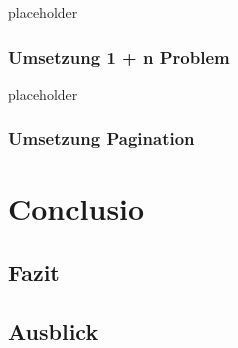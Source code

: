 \documentclass[bachelor, german ]{hgbthesis}
\begin{document}
placeholder
\pagebreak

\subsection{Umsetzung 1 + n Problem}

placeholder
\pagebreak

\subsection{Umsetzung Pagination}

\chapter{Conclusio}

\section{Fazit}

\section{Ausblick}

\printbibliography
\end{document}
